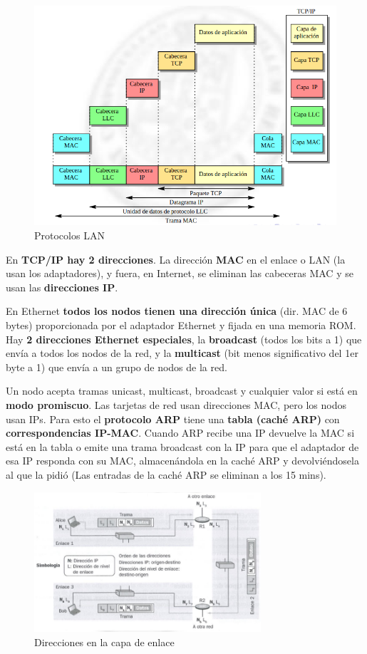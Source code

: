 \documentclass{article}
\begin{document}
\begin{figure}
    \centering
    \includegraphics[width=\linewidth]{img-t5/img_137_27.png}
    \caption{Protocolos LAN}
\end{figure}

En \textbf{TCP/IP hay 2 direcciones}. La dirección \textbf{MAC} en el enlace o LAN (la usan los adaptadores), y fuera, en Internet, se eliminan las cabeceras MAC y se usan las \textbf{direcciones IP}. 

En Ethernet \textbf{todos los nodos tienen una dirección única} (dir. MAC de 6 bytes) proporcionada por el adaptador Ethernet y fijada en una memoria ROM. 
Hay \textbf{2 direcciones Ethernet especiales}, la \textbf{broadcast} (todos los bits a 1) que envía a todos los nodos de la red, y la \textbf{multicast} (bit menos significativo del 1er byte a 1) que envía a un grupo de nodos de la red. 

Un nodo acepta tramas unicast, multicast, broadcast y cualquier valor si está en \textbf{modo promiscuo}. 
Las tarjetas de red usan direcciones MAC, pero los nodos usan IPs. Para esto el \textbf{protocolo ARP} tiene una \textbf{tabla (caché ARP)} con \textbf{correspondencias IP-MAC}. Cuando ARP recibe una IP devuelve la MAC si está en la tabla o emite una trama broadcast con la IP para que el adaptador de esa IP responda con su MAC, almacenándola en la caché ARP y devolviéndosela al que la pidió (Las entradas de la caché ARP se eliminan a los 15 mins).

\begin{figure}[h]
    \centering
    \includegraphics[width=0.75\textwidth]{img-t5/img_071_39.png}
    \caption{Direcciones en la capa de enlace}
\end{figure}
\end{document}
